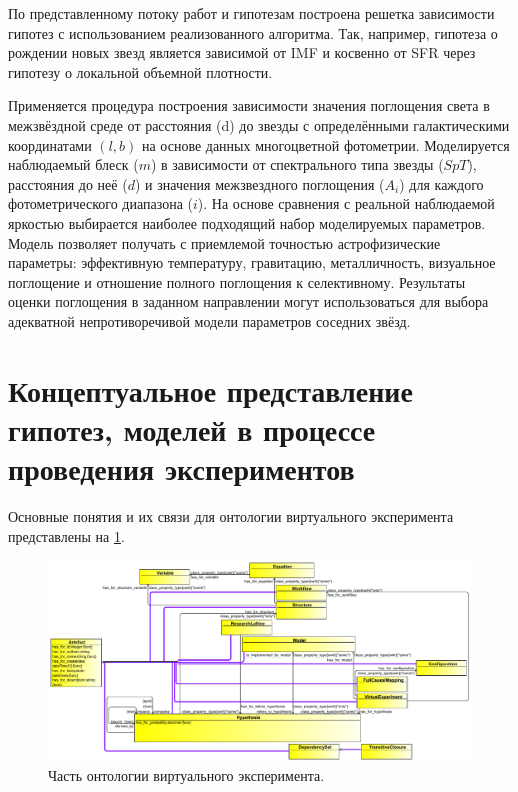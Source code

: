 По представленному потоку работ и гипотезам построена решетка зависимости гипотез с использованием реализованного 
алгоритма. Так, например, гипотеза о рождении новых звезд является зависимой от IMF и косвенно 
от SFR через гипотезу о локальной объемной плотности.

Применяется процедура построения зависимости значения поглощения света в межзвёздной среде от расстояния 
(d) до звезды с определёнными галактическими координатами $(l, b)$ на основе данных многоцветной фотометрии. 
Моделируется наблюдаемый блеск ($m$) в зависимости от спектрального типа звезды ($SpT$), расстояния до неё ($d$) 
и значения межзвездного поглощения ($A_i$) для каждого фотометрического диапазона ($i$). На основе сравнения с 
реальной наблюдаемой яркостью выбирается наиболее подходящий набор моделируемых параметров. Модель позволяет 
получать с приемлемой точностью астрофизические параметры: эффективную температуру, гравитацию, металличность, 
визуальное поглощение и отношение полного поглощения к селективному. Результаты оценки поглощения в заданном 
направлении могут использоваться для выбора адекватной непротиворечивой модели параметров соседних звёзд.


\section{Концептуальное представление гипотез, моделей в процессе проведения экспериментов} \label{sect2_4}

Основные понятия и их связи для онтологии виртуального эксперимента представлены на \cref{fig:ve_schema}.

\begin{figure}[h!]
    \centering
    \includegraphics[width=\linewidth]{images/ve_schema2.pdf}
    \caption{Часть онтологии виртуального эксперимента.}\label{fig:ve_schema}
\end{figure}

